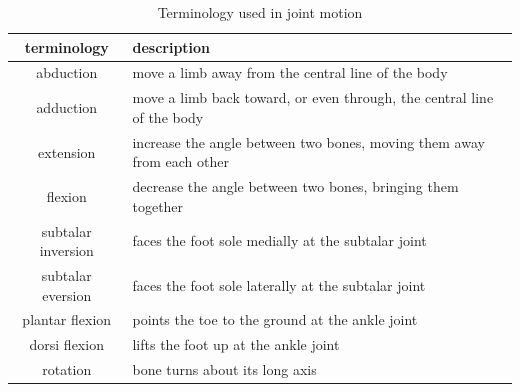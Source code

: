 \documentclass[master,english,final]{kaist-ucs}
\begin{document}
\begin{table}[h!]
\centering
  \begin{tabular}{cl}
  terminology         &  description \\
  \hline
  abduction           & move a limb away from the central line of the body \\
  adduction           & move a limb back toward, or even through, the central line of the body \\
  extension           & increase the angle between two bones, moving them away from each other \\
  flexion             & decrease the angle between two bones, bringing them together \\
  subtalar inversion  & faces the foot sole medially at the subtalar joint \\
  subtalar eversion   & faces the foot sole laterally at the subtalar joint \\
  plantar flexion     & points the toe to the ground at the ankle joint \\
  dorsi flexion       & lifts the foot up at the ankle joint \\
  rotation            & bone turns about its long axis \\
\end{tabular}
\caption{Terminology used in joint motion}
\label{termjointmot}
\end{table}



\end{document}
